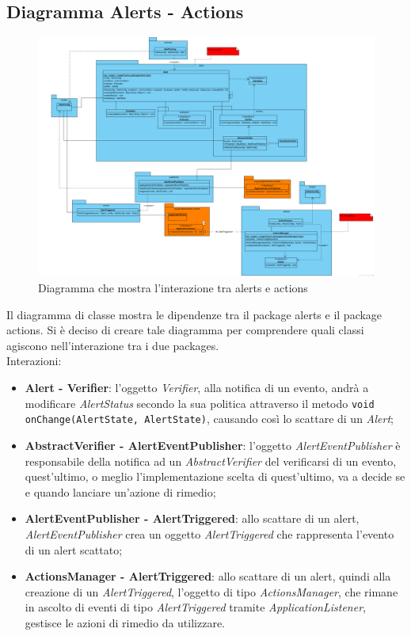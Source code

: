 \newpage

   \subsection{Diagramma Alerts - Actions}

        \begin{figure}[htbp]
            \centering
            \includegraphics[width=\textwidth]{./img/DiagrammiClasse/alertToAction.png}
            \caption[Diagramma alert - actions]{Diagramma che mostra l'interazione tra alerts e actions}
        \end{figure}
        Il diagramma di classe mostra le dipendenze tra il package alerts e il package actions. Si è deciso di creare tale diagramma per
        comprendere quali classi agiscono nell'interazione tra i due packages. \\
        Interazioni:
        \begin{itemize}
        	\item \textbf{Alert - Verifier}: l'oggetto \textit{Verifier}, alla notifica di un evento, andrà a modificare 
        		\textit{AlertStatus} secondo la sua politica attraverso il metodo \verb=void onChange(AlertState, AlertState)=, 
        		causando così lo scattare di un \textit{Alert};  
        	\item \textbf{AbstractVerifier - AlertEventPublisher}: l'oggetto \textit{AlertEventPublisher} è responsabile
        		della notifica ad un \textit{AbstractVerifier} del verificarsi di un evento, quest'ultimo, o meglio
        		l'implementazione scelta di quest'ultimo, va a decide se e quando lanciare un'azione di rimedio;
        	\item \textbf{AlertEventPublisher - AlertTriggered}: allo scattare di un alert, \textit{AlertEventPublisher}
        		crea un oggetto \textit{AlertTriggered} che rappresenta l'evento di un alert scattato;
        	\item \textbf{ActionsManager - AlertTriggered}: allo scattare di un alert, quindi alla creazione di un
        		\textit{AlertTriggered}, l'oggetto di tipo \textit{ActionsManager}, che rimane in ascolto di eventi
        		di tipo \textit{AlertTriggered} tramite \textit{ApplicationListener}, gestisce le azioni di rimedio
        		da utilizzare.
        \end{itemize}


